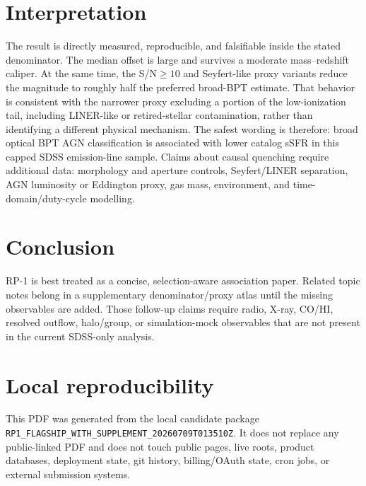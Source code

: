 \documentclass[twocolumn]{aastex631}
\begin{document}
\section{Interpretation}
The result is directly measured, reproducible, and falsifiable inside the stated denominator. The median offset is large and survives a moderate mass--redshift caliper. At the same time, the S/N$\geq10$ and Seyfert-like proxy variants reduce the magnitude to roughly half the preferred broad-BPT estimate. That behavior is consistent with the narrower proxy excluding a portion of the low-ionization tail, including LINER-like or retired-stellar contamination, rather than identifying a different physical mechanism. The safest wording is therefore: broad optical BPT AGN classification is associated with lower catalog sSFR in this capped SDSS emission-line sample. Claims about causal quenching require additional data: morphology and aperture controls, Seyfert/LINER separation, AGN luminosity or Eddington proxy, gas mass, environment, and time-domain/duty-cycle modelling.

\section{Conclusion}
RP-1 is best treated as a concise, selection-aware association paper. Related topic notes belong in a supplementary denominator/proxy atlas until the missing observables are added. Those follow-up claims require radio, X-ray, CO/HI, resolved outflow, halo/group, or simulation-mock observables that are not present in the current SDSS-only analysis.

\section{Local reproducibility}
This PDF was generated from the local candidate package \texttt{RP1\_FLAGSHIP\_WITH\_SUPPLEMENT\_20260709T013510Z}. It does not replace any public-linked PDF and does not touch public pages, live roots, product databases, deployment state, git history, billing/OAuth state, cron jobs, or external submission systems.
\end{document}
